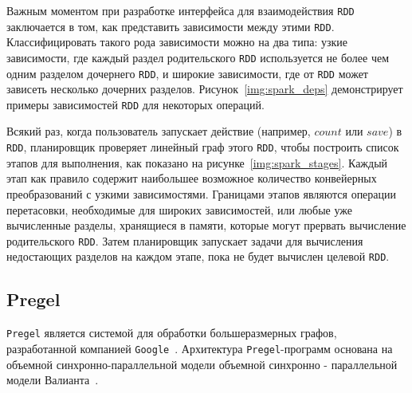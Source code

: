 
Важным моментом при разработке интерфейса для взаимодействия \texttt{RDD} заключается в том, как представить зависимости между этими \texttt{RDD}.
Классифицировать такого рода зависимости можно на два типа: узкие зависимости, где каждый раздел родительского \texttt{RDD} используется не более чем одним разделом дочернего \texttt{RDD}, и широкие зависимости, где от \texttt{RDD} может зависеть несколько дочерних разделов.
Рисунок~\ref{img:spark_deps} демонстрирует примеры зависимостей \texttt{RDD} для некоторых операций.


Всякий раз, когда пользователь запускает действие (например, $count$ или $save$) в \texttt{RDD}, планировщик проверяет линейный граф этого \texttt{RDD}, чтобы построить список этапов для выполнения, как показано на рисунке~\ref{img:spark_stages}.
Каждый этап как правило содержит наибольшее возможное количество конвейерных преобразований с узкими зависимостями.
Границами этапов являются операции перетасовки, необходимые для широких зависимостей, или любые уже вычисленные разделы, хранящиеся в памяти, которые могут прервать вычисление родительского \texttt{RDD}. 
Затем планировщик запускает задачи для вычисления недостающих разделов на каждом этапе, пока не будет вычислен целевой \texttt{RDD}.


\subsection{Pregel}

\texttt{Pregel} является системой для обработки большеразмерных графов, разработанной компанией \texttt{Google}~\cite{6425724}.
Архитектура \texttt{Pregel}-программ основана на объемной синхронно-параллельной модели объемной синхронно - параллельной модели Валианта~\cite{Valiant1990ABM}. 

